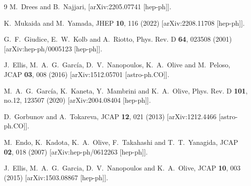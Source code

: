 \documentclass[aps,prev,twocolumn,preprintnumbers,floatfix,nofootinbib]{revtex4-1}
\begin{document}
\begin{thebibliography}{9}
M.~Drees and B.~Najjari,
[arXiv:2205.07741 [hep-ph]].

K.~Mukaida and M.~Yamada,
JHEP \textbf{10}, 116 (2022)
[arXiv:2208.11708 [hep-ph]].









G.~F.~Giudice, E.~W.~Kolb and A.~Riotto,
Phys. Rev. D \textbf{64}, 023508 (2001)
[arXiv:hep-ph/0005123 [hep-ph]].

J.~Ellis, M.~A.~G.~Garc{\' i}a, D.~V.~Nanopoulos, K.~A.~Olive and M.~Peloso,
JCAP \textbf{03}, 008 (2016)
[arXiv:1512.05701 [astro-ph.CO]].

M.~A.~G.~Garc{\' i}a, K.~Kaneta, Y.~Mambrini and K.~A.~Olive,
Phys. Rev. D \textbf{101}, no.12, 123507 (2020)
[arXiv:2004.08404 [hep-ph]].

D.~Gorbunov and A.~Tokareva,
JCAP \textbf{12}, 021 (2013)
[arXiv:1212.4466 [astro-ph.CO]].

M.~Endo, K.~Kadota, K.~A.~Olive, F.~Takahashi and T.~T.~Yanagida,
JCAP \textbf{02}, 018 (2007)
[arXiv:hep-ph/0612263 [hep-ph]].

J.~Ellis, M.~A.~G.~Garcia, D.~V.~Nanopoulos and K.~A.~Olive,
JCAP \textbf{10}, 003 (2015)
[arXiv:1503.08867 [hep-ph]].


\end{thebibliography}
\end{document}
